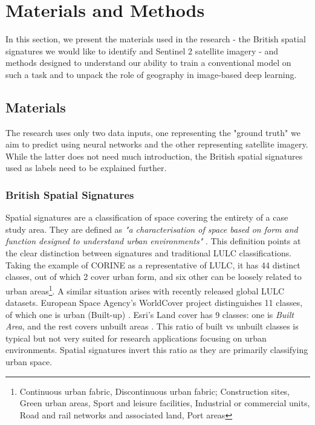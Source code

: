 \section{Materials and Methods}
\label{sec:matmet}

In this section, we present the materials used in the research - the British spatial
signatures we would like to identify and Sentinel 2 satellite
imagery - and methods designed to understand our ability to train a conventional model on
such a task and to unpack the role of geography in image-based deep learning.

\subsection{Materials}

The research uses only two data inputs, one representing the "ground truth" we aim to
predict using neural networks and the other representing satellite
imagery. While the latter does not need much introduction, the British spatial
signatures used as labels need to be explained further.

\subsubsection{British Spatial Signatures}

Spatial signatures are a classification of space covering the entirety of a case
study area. They are defined as \textit{"a characterisation of space based on form and
function designed to understand urban environments"} \citep{dab_mf_2021a}. This
definition points at the clear distinction between signatures and traditional
LULC classifications. Taking the example of CORINE
\citep{europeanenvironmentagency1990} as a representative of LULC, it has 44 distinct
classes, out of which 2 cover urban form, and six other can be loosely related to urban
areas\footnote{Continuous urban fabric, Discontinuous urban fabric; Construction sites,
Green urban areas, Sport and leisure facilities, Industrial or commercial units, Road
and rail networks and associated land, Port areas}. A similar situation arises with recently
released global LULC datasets. European Space Agency's WorldCover project distinguishes
11 classes, of which one is urban (Built-up) \citep{zanaga_daniele_2021_5571936}. Esri's
Land cover has 9 classes: one is \textit{Built Area}, and the rest covers unbuilt
areas \citep{karra2021global}. This ratio of built vs unbuilt classes is typical but not
very suited for research applications focusing on urban environments. Spatial signatures
invert this ratio as they are primarily classifying urban space.

